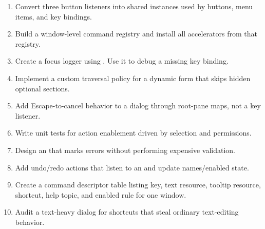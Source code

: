 \begin{exercisebox}
\begin{enumerate}
\item Convert three button listeners into shared  instances used by buttons, menu items, and key bindings.
\item Build a window-level command registry and install all accelerators from that registry.
\item Create a focus logger using . Use it to debug a missing key binding.
\item Implement a custom traversal policy for a dynamic form that skips hidden optional sections.
\item Add Escape-to-cancel behavior to a dialog through root-pane maps, not a key listener.
\item Write unit tests for action enablement driven by selection and permissions.
\item Design an  that marks errors without performing expensive validation.
\item Add undo/redo actions that listen to an  and update names/enabled state.
\item Create a command descriptor table listing key, text resource, tooltip resource, shortcut, help topic, and enabled rule for one window.
\item Audit a text-heavy dialog for shortcuts that steal ordinary text-editing behavior.
\end{enumerate}
\end{exercisebox}
